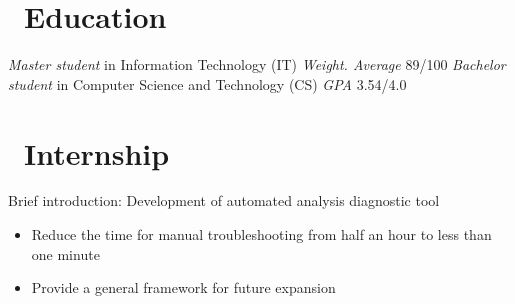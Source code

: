 \documentclass{resume}
\begin{document}



\section{\faGraduationCap\ Education}
\textit{Master student} in Information Technology (IT) \tab \textit{Weight. Average} 89/100
\textit{Bachelor student} in Computer Science and Technology (CS) \tab \textit{GPA} 3.54/4.0



\section{\faBriefcase\ Internship}

Brief introduction: Development of automated analysis diagnostic tool
\begin{itemize}
  \item Reduce the time for manual troubleshooting from half an hour to less than one minute
  \item Provide a general framework for future expansion
\end{itemize}
\end{document}
